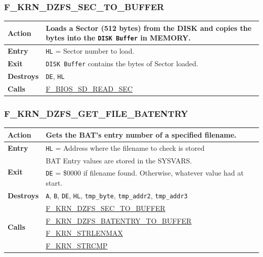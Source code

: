 \documentclass[a4paper,11pt]{article}
\begin{document}
        \subsubsection{F\_KRN\_DZFS\_SEC\_TO\_BUFFER}
        \label{func:fkrndzfssectobuffer}
        \begin{tabular}{l p{9cm}}
            \hline\textbf{Action}
            & Loads a Sector (512 bytes) from the \textbf{DISK} and copies the
            bytes into the \texttt{DISK Buffer} in \textbf{MEMORY}.\\
            \hline\textbf{Entry} & \texttt{HL} = Sector number to load.\\
            \hline\textbf{Exit} & \texttt{DISK Buffer} contains the bytes 
            of Sector loaded.\\
            \hline\textbf{Destroys} & \texttt{DE}, \texttt{HL} \\
            \hline\textbf{Calls}
            & \hyperref[func:fbiosdiskreadsec]{F\_BIOS\_SD\_READ\_SEC}\\
            \hline
        \end{tabular}

        \subsubsection{F\_KRN\_DZFS\_GET\_FILE\_BATENTRY}
        \label{func:fkrndzfsgetfilebatentry}
        \begin{tabular}{l p{9cm}}
            \hline\textbf{Action}
            & Gets the BAT's entry number of a specified filename.\\
            \hline\textbf{Entry} & \texttt{HL} = Address where the filename to 
            check is stored\\
            \hline\multirow[t]{2}{4em}{\textbf{Exit}}
            & BAT Entry values are stored in the SYSVARS.\\
            & \texttt{DE} = \$0000 if filename found. Otherwise, whatever value
            had at start.\\
            \hline\textbf{Destroys} & \texttt{A}, \texttt{B}, \texttt{DE}, \texttt{HL},
            \texttt{tmp\_byte}, \texttt{tmp\_addr2}, \texttt{tmp\_addr3} \\
            \hline\multirow[t]{4}{4em}{\textbf{Calls}}
            & \hyperref[func:fkrndzfssectobuffer]{F\_KRN\_DZFS\_SEC\_TO\_BUFFER}\\
            & \hyperref[func:fkrndzfsbatentrytobuffer]{F\_KRN\_DZFS\_BATENTRY\_TO\_BUFFER}\\
            & \hyperref[func:fkrnstrlenmax]{F\_KRN\_STRLENMAX}\\
            & \hyperref[func:fkrnstrcmp]{F\_KRN\_STRCMP}\\
            \hline
        \end{tabular}
\end{document}
